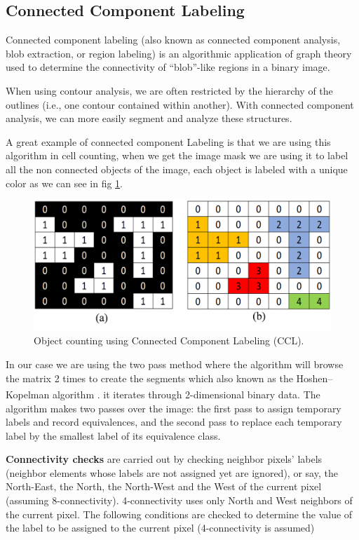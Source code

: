 \subsection{Connected Component Labeling}
\hspace{\parindent}
Connected component labeling (also known as connected component analysis, blob extraction, or region labeling) is an algorithmic application of graph theory used to determine the connectivity of “blob”-like regions in a binary image.

When using contour analysis, we are often restricted by the hierarchy of the outlines (i.e., one contour contained within another). With connected component analysis, we can more easily segment and analyze these structures.

A great example of connected component Labeling is that we are using this algorithm in cell counting, when we get the image mask we are using it to label all the non connected objects of the image, each object is labeled with a unique color as we can see in fig \ref{fig:connected_component_labeling}.

\begin{figure}[H]
\centering
    \centerline{\includegraphics[width = 4.6in]{../images/object-counting-using-connected.png}}
    \caption{Object counting using Connected Component Labeling (CCL).}
    \label{fig:connected_component_labeling}
\end{figure}

In our case we are using the two pass method where the algorithm will browse the matrix 2 times to create the segments which also known as the Hoshen–Kopelman algorithm \textsuperscript{\cite{hoshman2002}}. it iterates through 2-dimensional binary data. The algorithm makes two passes over the image: the first pass to assign temporary labels and record equivalences, and the second pass to replace each temporary label by the smallest label of its equivalence class. 

\textbf{Connectivity checks} are carried out by checking neighbor pixels' labels (neighbor elements whose labels are not assigned yet are ignored), or say, the North-East, the North, the North-West and the West of the current pixel (assuming 8-connectivity). 4-connectivity uses only North and West neighbors of the current pixel. The following conditions are checked to determine the value of the label to be assigned to the current pixel (4-connectivity is assumed) 

